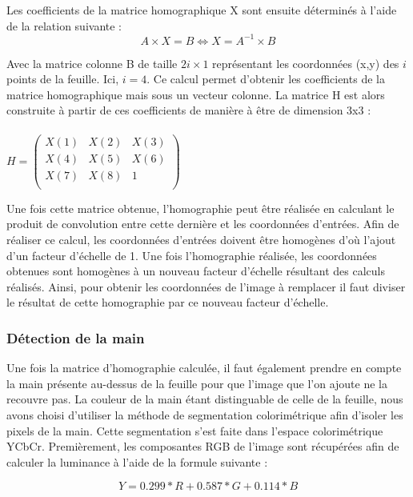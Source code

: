 \documentclass[blue]{ceri/sty/rapport}
\begin{document}
Les coefficients de la matrice homographique X sont ensuite déterminés à l'aide de la relation suivante : 
\\

 \begin{equation}
   A\times X=B \Leftrightarrow X=A^{-1}\times B
\end{equation}

Avec la matrice colonne B de taille $2i\times1$ représentant les coordonnées (x,y) des $i$ points de la feuille. Ici, $i=4$.
Ce calcul permet d'obtenir les coefficients de la matrice homographique mais sous un vecteur colonne. La matrice H est alors construite à partir de ces coefficients de manière à être de dimension 3x3 : \\
\\

$H = \begin{pmatrix}X(1)&X(2)&X(3)\\ 
X(4)&X(5)&X(6)\\ 
X(7)&X(8)&1\\ 
\end{pmatrix}$ 


Une fois cette matrice obtenue, l'homographie peut être réalisée en calculant le produit de convolution entre cette dernière et les coordonnées d'entrées. Afin de réaliser ce calcul, les coordonnées d'entrées doivent être homogènes d'où l'ajout d'un facteur d'échelle de 1. 
Une fois l'homographie réalisée, les coordonnées obtenues sont homogènes à un nouveau facteur d'échelle résultant des calculs réalisés. Ainsi, pour obtenir les coordonnées de l'image à remplacer il faut diviser le résultat de cette homographie par ce nouveau facteur d'échelle. 

\subsubsection{Détection de la main}
Une fois la matrice d'homographie calculée, il faut également prendre en compte la main présente au-dessus de la feuille pour que l'image que l'on ajoute ne la recouvre pas. 
La couleur de la main étant distinguable de celle de la feuille, nous avons choisi d'utiliser la méthode de segmentation colorimétrique afin d'isoler les pixels de la main. Cette segmentation s'est faite dans l'espace colorimétrique YCbCr.
Premièrement, les composantes RGB de l'image sont récupérées afin de calculer la luminance à l'aide de la formule suivante : 

\begin{equation}
   Y= 0.299*R+0.587*G+0.114*B
\end{equation}
\end{document}
